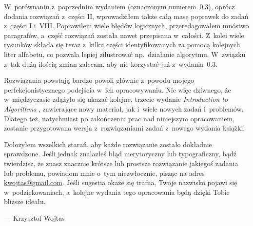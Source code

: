 W~porównaniu z~poprzednim wydaniem (oznaczonym numerem~0.3), oprócz dodania rozwiązań z~części II, wprowadziłem także całą masę poprawek do zadań z~części I i~VIII. Poprawiłem wiele błędów logicznych, przeredagowałem mnóstwo paragrafów, a~część rozwiązań została nawet przepisana w~całości. Z~kolei wiele rysunków składa się teraz z~kilku części identyfikowanych za pomocą kolejnych liter alfabetu, co pozwala lepiej zilustrować np.\ działanie algorytmu. W~związku z~tak dużą ilością zmian zalecam, aby nie korzystać już z~wydania~0.3.

Rozwiązania powstają bardzo powoli głównie z~powodu mojego perfekcjonistycznego podejścia w~ich opracowywaniu. Nic więc dziwnego, że w~międzyczasie zdążyło się ukazać kolejne, trzecie wydanie \textsl{Introduction to Algorithms} \cite{cormen3}, zawierające nowy materiał, jak i~wiele nowych zadań i~problemów. Dlatego też, natychmiast po zakończeniu prac nad niniejszym opracowaniem, zostanie przygotowana wersja z~rozwiązaniami zadań z~nowego wydania książki.

Dołożyłem wszelkich starań, aby każde rozwiązanie zostało dokładnie sprawdzone. Jeśli jednak znalazłeś błąd merytoryczny lub typograficzny, bądź twierdzisz, że znasz znacznie krótsze lub prostsze rozwiązanie jakiegoś zadania lub problemu, powiadom mnie o~tym niezwłocznie, pisząc na adres \url{kwojtas@gmail.com}. Jeśli sugestia okaże się trafna, Twoje nazwisko pojawi się w~podziękowaniach, a~kolejne wydania tego opracowania będą dzięki Tobie bliższe ideału.

\bigskip
\bigskip
{}\hfill--- Krzysztof Wojtas

\endinput
